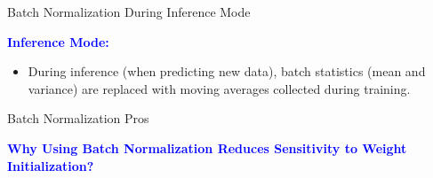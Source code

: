 \documentclass[serif, aspectratio=169]{beamer}
\begin{document}
\begin{frame}{Batch Normalization During Inference Mode}
	
	\textcolor{blue}{\textbf{Inference Mode:}}
	
	\begin{itemize}
		
		\item During inference (when predicting new data), batch statistics (mean and variance) are replaced with moving averages collected during training.
		
	\end{itemize}
\end{frame}

\begin{frame}{Batch Normalization Pros}

    \textcolor{blue}{\textbf{Why Using Batch Normalization Reduces Sensitivity to Weight Initialization?}}

    \begin{figure}[h]
        \centering
    \end{figure}

    \vfill
    
\end{frame}
\end{document}
